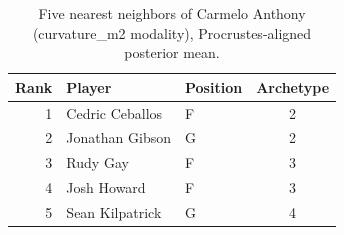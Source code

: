 \begin{table}[htbp]
  \centering\small
  \begin{tabular}{rllc}
    \toprule
    Rank & Player & Position & Archetype \\
    \midrule
    1 & Cedric Ceballos & F & 2 \\
    2 & Jonathan Gibson & G & 2 \\
    3 & Rudy Gay & F & 3 \\
    4 & Josh Howard & F & 3 \\
    5 & Sean Kilpatrick & G & 4 \\
    \bottomrule
  \end{tabular}
  \caption{Five nearest neighbors of Carmelo Anthony (curvature_m2 modality), Procrustes-aligned posterior mean.}
  \label{tab:Carmelo_Anthony_neighbors_curvature_m2}
\end{table}

